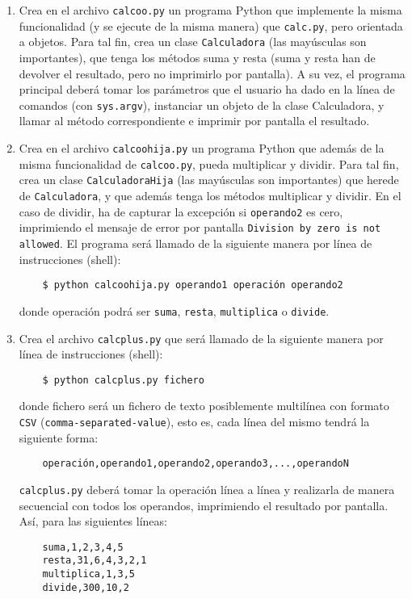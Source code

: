 \documentclass[11pt,a4paper]{article}
\newcommand{\finejercicio}{
  \begin{footnotesize}
    [Al terminar el ejercicio es recomendable hacer \texttt{commit} de los ficheros modificados]
  \end{footnotesize}
}
\renewcommand{\finejercicio}{
}
\begin{document}
\begin{enumerate}
  \item Crea en el archivo \texttt{calcoo.py} un programa Python que implemente la misma funcionalidad (y se ejecute de la misma manera) que \texttt{calc.py}, pero orientada a objetos. Para tal fin, crea un clase \texttt{Calculadora} (las mayúsculas son importantes), que tenga los métodos suma y resta (suma y resta han de devolver el resultado, pero no imprimirlo por pantalla). A su vez, el programa principal deberá tomar los parámetros que el usuario ha dado en la línea de comandos (con \texttt{sys.argv}), instanciar un objeto de la clase Calculadora, y llamar al método correspondiente e imprimir por pantalla el resultado.

\finejercicio

  \item Crea en el archivo \texttt{calcoohija.py} un programa Python que además de la misma funcionalidad de \texttt{calcoo.py}, pueda multiplicar y dividir. Para tal fin, crea un clase \texttt{CalculadoraHija} (las mayúsculas son importantes) que herede de \texttt{Calculadora}, y que además tenga los métodos multiplicar y dividir. En el caso de dividir, ha de capturar la excepción si \texttt{operando2} es cero, imprimiendo el mensaje de error por pantalla \texttt{Division by zero is not allowed}.
El programa será llamado de la siguiente manera por línea de instrucciones (shell):
    \begin{verbatim}
    $ python calcoohija.py operando1 operación operando2
    \end{verbatim}
donde operación podrá ser \texttt{suma}, \texttt{resta}, \texttt{multiplica} o \texttt{divide}.

\finejercicio

  \item Crea el archivo \texttt{calcplus.py} que será llamado de la siguiente manera por línea de instrucciones (shell):
    \begin{verbatim}
    $ python calcplus.py fichero
    \end{verbatim}
donde fichero será un fichero de texto posiblemente multilínea con formato \texttt{CSV} (\texttt{comma-separated-value}), esto es, cada línea del mismo tendrá la siguiente forma:
    \begin{verbatim}
    operación,operando1,operando2,operando3,...,operandoN
    \end{verbatim}

	\texttt{calcplus.py} deberá tomar la operación línea a línea y realizarla de manera secuencial con todos los operandos, imprimiendo el resultado por pantalla. Así, para las siguientes líneas:
    \begin{verbatim}
    suma,1,2,3,4,5
    resta,31,6,4,3,2,1
    multiplica,1,3,5
    divide,300,10,2
    \end{verbatim}


\end{enumerate}
\end{document}
